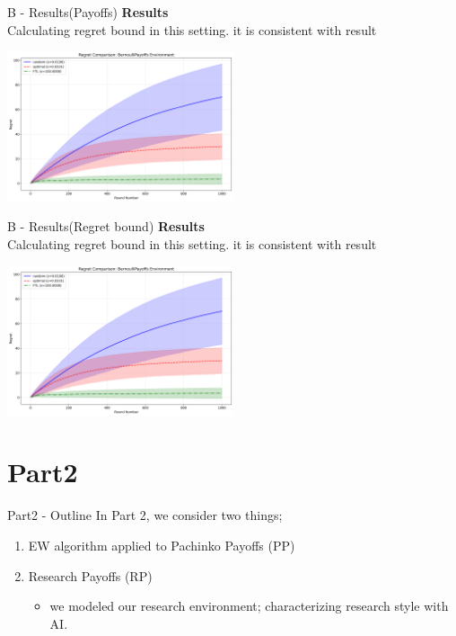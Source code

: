 \documentclass{beamer}
\begin{document}
\begin{frame}{B - Results(Payoffs)}
\textbf{Results}\\
Calculating regret bound in this setting. it is consistent with result
\begin{center}
    \includegraphics[width=0.5\textwidth]{332Project2/figures/bernoulli_regret_comparison.png}
\end{center}
\end{frame}

\begin{frame}{B - Results(Regret bound)}
\textbf{Results}\\
Calculating regret bound in this setting. it is consistent with result
\begin{center}
    \includegraphics[width=0.5\textwidth]{332Project2/figures/bernoulli_regret_comparison.png}
\end{center}
\end{frame}


\section{Part2}

\begin{frame}{Part2 - Outline}
In Part 2, we consider two things;
\begin{enumerate}
    \item EW algorithm applied to Pachinko Payoffs (PP)
    \item Research Payoffs (RP)
    \begin{itemize}
        \item we modeled our research environment; characterizing research style with AI.
    \end{itemize}
\end{enumerate}
\end{frame}
\end{document}
